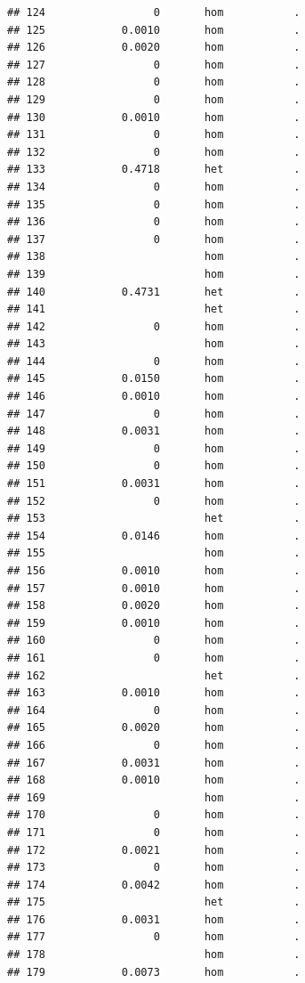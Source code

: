 \documentclass[
]{article}
\begin{document}
\begin{verbatim}
## 124                 0       hom           .
## 125            0.0010       hom           .
## 126            0.0020       hom           .
## 127                 0       hom           .
## 128                 0       hom           .
## 129                 0       hom           .
## 130            0.0010       hom           .
## 131                 0       hom           .
## 132                 0       hom           .
## 133            0.4718       het           .
## 134                 0       hom           .
## 135                 0       hom           .
## 136                 0       hom           .
## 137                 0       hom           .
## 138                         hom           .
## 139                         hom           .
## 140            0.4731       het           .
## 141                         het           .
## 142                 0       hom           .
## 143                         hom           .
## 144                 0       hom           .
## 145            0.0150       hom           .
## 146            0.0010       hom           .
## 147                 0       hom           .
## 148            0.0031       hom           .
## 149                 0       hom           .
## 150                 0       hom           .
## 151            0.0031       hom           .
## 152                 0       hom           .
## 153                         het           .
## 154            0.0146       hom           .
## 155                         hom           .
## 156            0.0010       hom           .
## 157            0.0010       hom           .
## 158            0.0020       hom           .
## 159            0.0010       hom           .
## 160                 0       hom           .
## 161                 0       hom           .
## 162                         het           .
## 163            0.0010       hom           .
## 164                 0       hom           .
## 165            0.0020       hom           .
## 166                 0       hom           .
## 167            0.0031       hom           .
## 168            0.0010       hom           .
## 169                         hom           .
## 170                 0       hom           .
## 171                 0       hom           .
## 172            0.0021       hom           .
## 173                 0       hom           .
## 174            0.0042       hom           .
## 175                         het           .
## 176            0.0031       hom           .
## 177                 0       hom           .
## 178                         hom           .
## 179            0.0073       hom           .

\end{verbatim}
\end{document}
